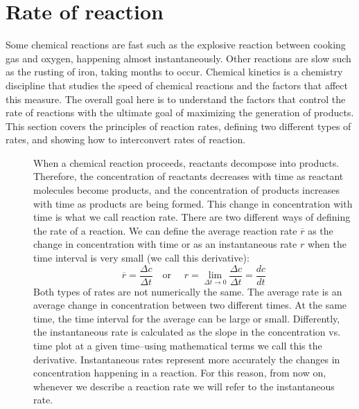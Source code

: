 \documentclass[main.tex]{subfiles}
\newcommand\chapterlabel{Ch-kinetics}
\begin{document}
\section{Rate of reaction}
Some chemical reactions are fast such as the explosive reaction between cooking gas and oxygen, happening almost instantaneously. Other reactions are slow such as the rusting of iron, taking months to occur. Chemical kinetics is a chemistry discipline that studies the speed of chemical reactions and the factors that affect this measure. The overall goal here is to understand the factors that control the rate of reactions with the ultimate goal of maximizing the generation of products. This section covers the principles of reaction rates, defining two different types of rates, and showing how to interconvert rates of reaction.
\sloppy 
\begin{description}
\item[] 
When a chemical reaction proceeds, reactants decompose into products. Therefore, the concentration of reactants decreases with time as reactant molecules become products, and the concentration of products increases with time as products are being formed. This change in concentration with time is what we call reaction rate. There are two different ways of defining the rate of a reaction. We can define the average reaction rate $\overline{r}$ as the change in concentration with time or as an instantaneous rate $r$ when the time interval is very small (we call this derivative):
\begin{equation}
\boxed{\overline{r}=\frac{\Delta c}{\Delta t} 
\quad  \text{or }\quad 
 r=\lim\limits_{\Delta t \to 0}     \frac{\Delta c}{\Delta t}=\frac{d c}{d t}}
\label{\chapterlabel:equation1}
\end{equation}
Both types of rates are not numerically the same. The average rate is an average change in concentration between two different times. At the same time, the time interval for the average can be large or small.
Differently, the instantaneous rate is calculated as the slope in the concentration vs. time plot at a given time--using mathematical terms we call this the derivative. Instantaneous rates represent more accurately the changes in concentration happening in a reaction. For this reason, from now on, whenever we describe a reaction rate we will refer to the instantaneous rate.
\item[] 

\end{description}
\end{document}
